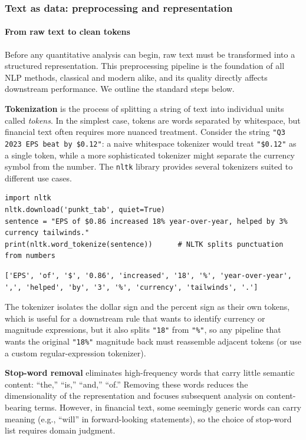 \subsubsection{Text as data: preprocessing and representation}

\paragraph{From raw text to clean tokens}

Before any quantitative analysis can begin, raw text must be transformed into a structured representation. This preprocessing pipeline is the foundation of all NLP methods, classical and modern alike, and its quality directly affects downstream performance. We outline the standard steps below.

\textbf{Tokenization} is the process of splitting a string of text into individual units called \textit{tokens}. In the simplest case, tokens are words separated by whitespace, but financial text often requires more nuanced treatment. Consider the string \texttt{"Q3 2023 EPS beat by \$0.12"}: a naive whitespace tokenizer would treat \texttt{"\$0.12"} as a single token, while a more sophisticated tokenizer might separate the currency symbol from the number. The \texttt{nltk} library provides several tokenizers suited to different use cases.

\begin{verbatim}
import nltk
nltk.download('punkt_tab', quiet=True)
sentence = "EPS of $0.86 increased 18% year-over-year, helped by 3% currency tailwinds."
print(nltk.word_tokenize(sentence))      # NLTK splits punctuation from numbers
\end{verbatim}

\begin{verbatim}
['EPS', 'of', '$', '0.86', 'increased', '18', '%', 'year-over-year', ',', 'helped', 'by', '3', '%', 'currency', 'tailwinds', '.']
\end{verbatim}

The tokenizer isolates the dollar sign and the percent sign as their own tokens, which is useful for a downstream rule that wants to identify currency or magnitude expressions, but it also splits \texttt{"18"} from \texttt{"\%"}, so any pipeline that wants the original \texttt{"18\%"} magnitude back must reassemble adjacent tokens (or use a custom regular-expression tokenizer).

\textbf{Stop-word removal} eliminates high-frequency words that carry little semantic content: ``the,'' ``is,'' ``and,'' ``of.'' Removing these words reduces the dimensionality of the representation and focuses subsequent analysis on content-bearing terms. However, in financial text, some seemingly generic words can carry meaning (e.g., ``will'' in forward-looking statements), so the choice of stop-word list requires domain judgment.

